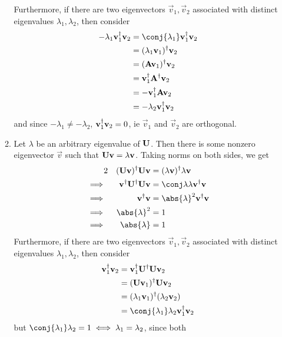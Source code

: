 \documentclass[fleqn,a4paper,11pt]{article}
\begin{document}
\begin{enumerate}[label=\textbf{\arabic*.}]
\begin{enumerate}[label=(\roman*)]
     Furthermore, if there are two eigenvectors \(\vec v_1, \vec v_2\)
     associated with distinct eigenvalues \(\lambda_1, \lambda_2\), then
     consider
     \begin{align*}
      -\lambda_1 \herm{\vec v_1} \vec v_2
      &= \conj{\lambda_1} \herm{\vec v_1} \vec v_2 \\
      &= \herm{(\lambda_1 \vec v_1)} \vec v_2 \\
      &= \herm{(\mat A \vec v_1)} \vec v_2 \\
      &= \herm{\vec v_1} \herm{\mat  A} \vec v_2 \\
      &= -\herm{\vec v_1} \mat  A \vec v_2 \\
      &= -\lambda_2 \herm{\vec v_1} \vec v_2
     \end{align*}
     and since \(-\lambda_1 \ne -\lambda_2\), \(\mathrm{\mathbf{v}}_1^\dag\mathrm{\mathbf{v}}_2 = 0\),
     ie \(\vec v_1\) and \(\vec v_2\) are orthogonal.
    \item
     Let \(\lambda\) be an arbitrary eigenvalue of \(\mathbf{U}\). Then there is
     some nonzero eigenvector \(\vec v\) such that
     \(\mathbf{U} \mathrm{\mathbf{v}} = \lambda \mathrm{\mathbf{v}}\). Taking norms on both sides, we get
     \begin{alignat*}2
      && \herm{(\mat U \vec v)} \mat U \vec v
      &= \herm{(\lambda \vec v)} \lambda \vec v \\
      \implies{}&&
      \herm{\vec v} \herm{\mat U} \mat U \vec v
      &= \conj \lambda \lambda \herm{\vec v} \vec v \\
      \implies{}&&
      \herm{\vec v} \vec v
      &= \abs{\lambda}^2 \herm{\vec v} \vec v \\
      \implies{}&&
      \abs{\lambda}^2 &= 1 \\
      \implies{}&&
      \abs{\lambda} &= 1
     \end{alignat*}
     Furthermore, if there are two eigenvectors \(\vec v_1, \vec v_2\)
     associated with distinct eigenvalues \(\lambda_1, \lambda_2\), then
     consider
     \begin{align*}
      \herm{\vec v_1} \vec v_2
      &= \herm{\vec v_1} \herm{\mat U} \mat U \vec v_2 \\
      &= \herm{(\mat U \vec v_1)} \mat U \vec v_2 \\
      &= \herm{(\lambda_1 \vec v_1)} (\lambda_2 \vec v_2) \\
      &= \conj{\lambda_1} \lambda_2 \herm{\vec v_1} \vec v_2
     \end{align*}
     but
     \(\conj{\lambda_1} \lambda_2 = 1 \iff \lambda_1 = \lambda_2\), since both

\end{enumerate}
\end{enumerate}
\end{document}
